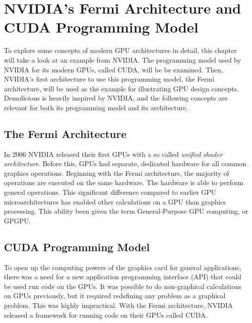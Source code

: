\documentclass[../main/report.tex]{subfiles}
\begin{document}
\chapter{NVIDIA's Fermi Architecture and CUDA Programming Model}
\label{sec:fermi}


To explore some concepts of modern GPU architectures in detail, this chapter will take a look at an example from NVIDIA.
The programming model used by NVIDIA for its modern GPUs, called CUDA, will be be examined.
Then, NVIDIA's first architecture to use this programming model, the Fermi architecture, will be used as the example for illustrating GPU design concepts.  
Demolicious is heavily inspired by NVIDIA, and the following concepts are relevant for both its programming model and its architecture.


\section{The Fermi Architecture}

In 2006 NVIDIA released their first GPUs with a so called \emph{unified shader architecture}.
Before this, GPUs had separate, dedicated hardware for all common graphics operations. 
Beginning with the Fermi architecture, the majority of operations are executed on the same hardware.
The hardware is able to perform general operations.
This significant difference compared to earlier GPU microarchitectures has enabled other calculations on a GPU than graphics processing.
This ability been given the term General-Purpose GPU computing, or GPGPU.


\section{CUDA Programming Model}

To open up the computing powers of the graphics card for general applications, there was a need for a new application programming interface (API) that could be used run code on the GPUs.
It was possible to do non-graphical calculations on GPUs previously, but it required redefining any problem as a graphical problem.
This was highly impractical. 
With the Fermi architecture, NVIDIA released a framework for running code on their GPUs called CUDA.
\end{document}

